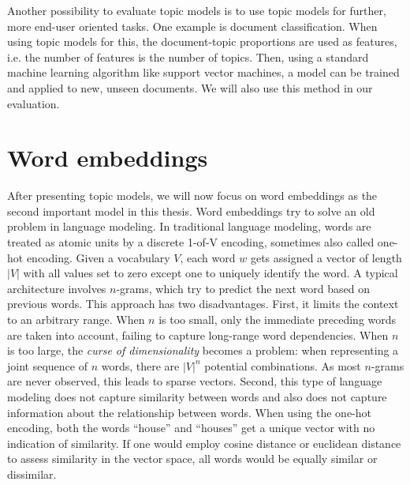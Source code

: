 \documentclass[
        a4paper,
        titlepage,
        twoside,
        parskip
        ]{scrbook}
\theoremstyle{break}
\begin{document}
Another possibility to evaluate topic models is to use topic models for further, more end-user oriented tasks.
One example is document classification.
When using topic models for this, the document-topic proportions are used as features, i.e. the number of features is the number of topics.
Then, using a standard machine learning algorithm like support vector machines, a model can be trained and applied to new, unseen documents.
We will also use this method in our evaluation.

\section{Word embeddings}

After presenting topic models, we will now focus on word embeddings as the second important model in this thesis.
Word embeddings try to solve an old problem in language modeling.
In traditional language modeling, words are treated as atomic units by a discrete 1-of-V encoding, sometimes also called one-hot encoding.
Given a vocabulary $V$, each word $w$ gets assigned a vector of length $|V|$ with all values set to zero except one to uniquely identify the word.
A typical architecture involves $n$-grams, which try to predict the next word based on previous words.
This approach has two disadvantages.
First, it limits the context to an arbitrary range.
When $n$ is too small, only the immediate preceding words are taken into account, failing to capture long-range word dependencies.
When $n$ is too large, the \emph{curse of dimensionality} becomes a problem: when representing a joint sequence of $n$ words, there are $|V|^n$ potential combinations.
As most $n$-grams are never observed, this leads to sparse vectors.
Second, this type of language modeling does not capture similarity between words and also does not capture information about the relationship between words.
When using the one-hot encoding, both the words ``house'' and ``houses'' get a unique vector with no indication of similarity.
If one would employ cosine distance or euclidean distance to assess similarity in the vector space, all words would be equally similar or dissimilar.
\end{document}
